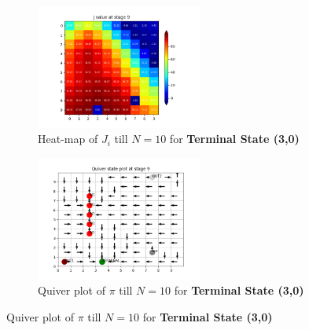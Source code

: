 \begin{figure}[h]
\begin{subfigure}
\centering
\includegraphics[angle=0,width=0.6\textwidth]{hw2/logs/t=3_N=10/J-heatmap-9.png}
\caption{Heat-map of $J_i$ till $N=10$ for \textbf{Terminal State (3,0)}}
\end{subfigure}

\begin{subfigure}
\centering
\includegraphics[angle=0,width=0.6\textwidth]{hw2/logs/t=3_N=10/quiver-9.png}
\caption{Quiver plot of $\pi$ till $N=10$ for \textbf{Terminal State (3,0)}}
\end{subfigure}
\end{figure}

